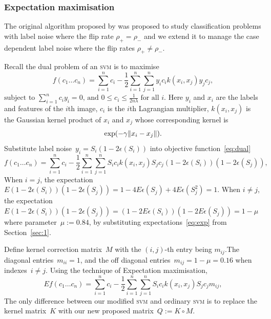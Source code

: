 \documentclass{article} %
\DeclarePairedDelimiter{\norm}{\lVert}{\rVert}
\begin{document}
\subsubsection{Expectation maximisation}
The original algorithm proposed by \citet{pmlr-v20-biggio11} was proposed to study classification problems with label noise where the flip rate $\rho_+=\rho_-$ and we extend it to manage the case dependent label noise where the flip rates $\rho_+\neq\rho_-$.

Recall the dual problem of an \textsc{svm} is to maximise
\begin{equation}
   f(c_{1}\ldots c_{n})=\sum _{i=1}^{n}c_{i}-{\frac {1}{2}}\sum _{i=1}^{n}\sum _{j=1}^{n}y_{i}c_{i}k(x_{i},x_{j})y_{j}c_{j}, \label{eq:dual}
\end{equation}
\begin{math}
{\text{subject to }}\sum _{i=1}^{n}c_{i}y_{i}=0,\,{\text{and }}0\leq c_{i}\leq {\frac {1}{2n\lambda }}\;{\text{for all }}i. 
\end{math} 
Here $y_i$ and $x_i$ are the labels and features of the $i$th image, $c_i$ is the $i$th Lagrangian multiplier, $k(x_i,x_j)$ is the Gaussian kernel product of $x_i$ and $x_j$ whose corresponding kernel is
\begin{equation*}
\exp(-\gamma\norm{x_i-x_j}).
\end{equation*}
Substitute label noise~$y_i=S_i(1-2\epsilon(S_i))$ into objective function~\eqref{eq:dual}
\begin{equation}
   f(c_{1}\ldots c_{n})=\sum _{i=1}^{n}c_{i}-{\frac {1}{2}}\sum _{i=1}^{n}\sum _{j=1}^{n}S_{i}c_{i}k(x_{i},x_{j})S_{j}c_{j}(1-2\epsilon(S_i))(1-2\epsilon(S_j)), \label{eq:dual2}
\end{equation}
When $i=j$, the expectation~$E(1-2\epsilon(S_i))(1-2\epsilon(S_j))=1-4E\epsilon(S_j)+4E\epsilon(S_j^2)=1$. When $i\neq j$, the expectation~$E(1-2\epsilon(S_i))(1-2\epsilon(S_j))=(1-2E\epsilon(S_i))(1-2E\epsilon(S_j))=1-\mu$ where parameter~$\mu:=0.84$, by substituting expectations~\eqref{eq:exp} from Section~\ref{sec:1}. 

Define kernel correction matrix~$M$ with the $(i,j)$-th entry being $m_{ij}$.The diagonal entries~$m_{ii}=1 $, and the off diagonal entries~$m_{ij}=1-\mu=0.16$ when indexes~$i\neq j$. Using the technique of Expectation maximisation, 
\begin{equation}
   Ef(c_{1}\ldots c_{n})=\sum _{i=1}^{n}c_{i}-{\frac {1}{2}}\sum _{i=1}^{n}\sum _{j=1}^{n}S_{i}c_{i}k(x_{i},x_{j})S_{j}c_{j}m_{ij}, \label{eq:dual3}
\end{equation}
The only difference between our modified \textsc{svm} and ordinary \textsc{svm} is to replace the kernel matrix~$K$ with our new proposed matrix~$Q:=K\circ M$.
\end{document}

